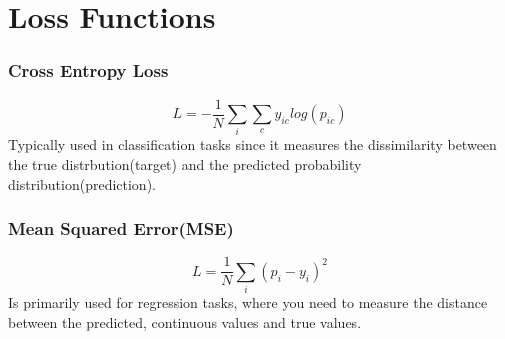 \documentclass{article}
\begin{document}
\section*{Loss Functions}
\subsubsection*{Cross Entropy Loss}
\[
L = -\frac{1}{N}\sum_i\sum_{c}y_{ic}log(p_{ic})
\]
Typically used in classification tasks since it measures the dissimilarity between the true distrbution(target) and
the predicted probability distribution(prediction).
\subsubsection*{Mean Squared Error(MSE)}
\[
L = \frac{1}{N}\sum_i(p_i - y_i)^2
\]
Is primarily used for regression tasks, where you need to measure the distance between the predicted, continuous values and true values.
\end{document}
